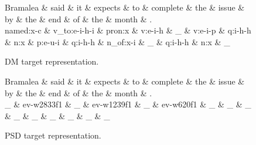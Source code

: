 \begin{figure}
    \centering
    \smaller[]
    \smaller[]
    \smaller[]
    \begin{dependency}[]
        \begin{deptext}[column sep=0.5em, row sep=.1ex]
            Bramalea \& said \& it \& expects \& to \& complete \& the \& issue \& by \& the \& end \& of \& the \& month \& . \\
            named:x-c \& v\_to:e-i-h-i \& pron:x \& v:e-i-h \& \_ \& v:e-i-p \& q:i-h-h \& n:x \& p:e-u-i \& q:i-h-h \& n\_of:x-i \& \_ \& q:i-h-h \& n:x \& \_ \\
        \end{deptext}
    \end{dependency}
    \caption{DM target representation.}
    \label{DM}
\end{figure}

\begin{figure}
    \centering
    \smaller[]
    \smaller[]
    \begin{dependency}[]
        \begin{deptext}[column sep=0.2em, row sep=.1ex]
            Bramalea \& said \& it \& expects \& to \& complete \& the \& issue \& by \& the \& end \& of \& the \& month \& . \\
            \_ \& ev-w2833f1 \& \_ \& ev-w1239f1 \& \_ \& ev-w620f1 \& \_ \& \_ \& \_ \& \_ \& \_ \& \_ \& \_ \& \_ \& \_ \\
        \end{deptext}
    \end{dependency}
    \caption{PSD target representation.}
    \label{PSD}
\end{figure}

\begin{displayquote}

\end{displayquote}

